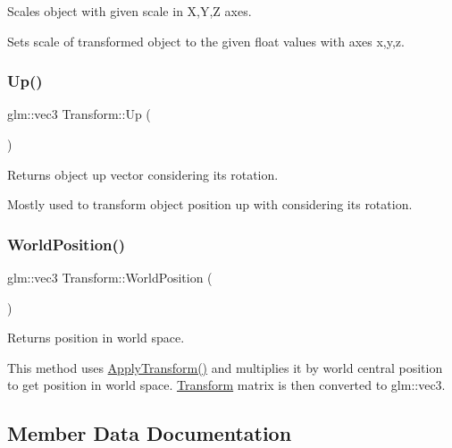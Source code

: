 Scales object with given scale in X,Y,Z axes. 

Sets scale of transformed object to the given float values with axes x,y,z. \mbox{\label{class_transform_a647f01f73a5ad2d729080649bc477b76}} 
\subsubsection{\texorpdfstring{Up()}{Up()}}
{\footnotesize\ttfamily glm\+::vec3 Transform\+::\+Up (\begin{DoxyParamCaption}{ }\end{DoxyParamCaption})\hspace{0.3cm}{\ttfamily [inline]}}



Returns object up vector considering it\textquotesingle{}s rotation. 

Mostly used to transform object position up with considering it\textquotesingle{}s rotation. \mbox{\label{class_transform_a631ff0990e3297ed142ce6f5259c2c1a}} 
\subsubsection{\texorpdfstring{WorldPosition()}{WorldPosition()}}
{\footnotesize\ttfamily glm\+::vec3 Transform\+::\+World\+Position (\begin{DoxyParamCaption}{ }\end{DoxyParamCaption})}



Returns position in world space. 

This method uses \mbox{\hyperlink{class_transform_a550c9c8417c6d288e6352d6cc424a0e9}{Apply\+Transform()}} and multiplies it by world central position to get position in world space. \mbox{\hyperlink{class_transform}{Transform}} matrix is then converted to glm\+::vec3. 

\subsection{Member Data Documentation}
\mbox{\label{class_transform_aa1e92491c9905869a108ec09a08e5eb4}} 
